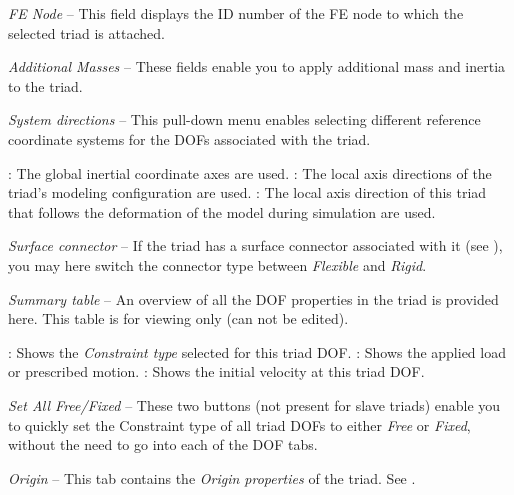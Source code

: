 \begin{bulletlist}
\item{\sl FE Node} -- This field
  displays the ID number of the FE node to which the selected triad is attached.


\item{\sl Additional Masses} --
  These fields enable you to apply additional mass and inertia to the triad.

\item{\sl System directions} --
  This pull-down menu enables selecting different reference coordinate systems
  for the DOFs associated with the triad.
  \vskip-3mm
  \begin{itemize}
   :
    The global inertial coordinate axes are used.
   :
    The local axis directions of the triad's modeling configuration are used.
   :
    The local axis direction of this triad that follows the deformation
    of the model during simulation are used.
  \end{itemize}

\item{\sl Surface connector} --
  If the triad has a surface connector associated with it
  (see ), you may here
  switch the connector type between {\sl Flexible} and {\sl Rigid}.

\item{\sl Summary table} --
  An overview of all the DOF properties in the triad is provided here.
  This table is for viewing only (can not be edited).
  \begin{itemize}
   :
    Shows the {\sl Constraint type} selected for this triad DOF.
   :
    Shows the applied load or prescribed motion.
   :
    Shows the initial velocity at this triad DOF.
  \end{itemize}

\item{\sl Set All Free/Fixed} --
  These two buttons (not present for slave triads) enable you to quickly set the
  Constraint type of all triad DOFs to either {\sl Free} or {\sl Fixed},
  without the need to go into each of the DOF tabs.

\item{\sl Origin} --
  This tab contains the {\sl Origin properties} of the triad.
  See .


\end{bulletlist}
